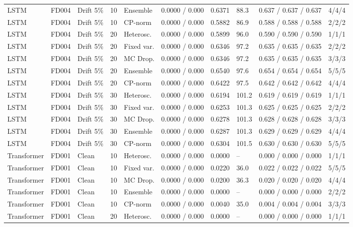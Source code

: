 \documentclass[10pt,a4paper]{article}
\begin{document}
\begin{landscape}
\begin{center}
\begin{longtable}{lllllcclll}
LSTM & FD004 & Drift 5\% & 10 & Ensemble & 0.0000 / 0.000 & 0.6371 & 88.3 & 0.637 / 0.637 / 0.637 & 4/4/4 \\
LSTM & FD004 & Drift 5\% & 10 & CP-norm & 0.0000 / 0.000 & 0.5882 & 86.9 & 0.588 / 0.588 / 0.588 & 2/2/2 \\
LSTM & FD004 & Drift 5\% & 20 & Heterosc. & 0.0000 / 0.000 & 0.5899 & 96.0 & 0.590 / 0.590 / 0.590 & 1/1/1 \\
LSTM & FD004 & Drift 5\% & 20 & Fixed var. & 0.0000 / 0.000 & 0.6346 & 97.2 & 0.635 / 0.635 / 0.635 & 2/2/2 \\
LSTM & FD004 & Drift 5\% & 20 & MC Drop. & 0.0000 / 0.000 & 0.6346 & 97.2 & 0.635 / 0.635 / 0.635 & 3/3/3 \\
LSTM & FD004 & Drift 5\% & 20 & Ensemble & 0.0000 / 0.000 & 0.6540 & 97.6 & 0.654 / 0.654 / 0.654 & 5/5/5 \\
LSTM & FD004 & Drift 5\% & 20 & CP-norm & 0.0000 / 0.000 & 0.6422 & 97.5 & 0.642 / 0.642 / 0.642 & 4/4/4 \\
LSTM & FD004 & Drift 5\% & 30 & Heterosc. & 0.0000 / 0.000 & 0.6194 & 101.2 & 0.619 / 0.619 / 0.619 & 1/1/1 \\
LSTM & FD004 & Drift 5\% & 30 & Fixed var. & 0.0000 / 0.000 & 0.6253 & 101.3 & 0.625 / 0.625 / 0.625 & 2/2/2 \\
LSTM & FD004 & Drift 5\% & 30 & MC Drop. & 0.0000 / 0.000 & 0.6278 & 101.3 & 0.628 / 0.628 / 0.628 & 3/3/3 \\
LSTM & FD004 & Drift 5\% & 30 & Ensemble & 0.0000 / 0.000 & 0.6287 & 101.3 & 0.629 / 0.629 / 0.629 & 4/4/4 \\
LSTM & FD004 & Drift 5\% & 30 & CP-norm & 0.0000 / 0.000 & 0.6304 & 101.5 & 0.630 / 0.630 / 0.630 & 5/5/5 \\
Transformer & FD001 & Clean & 10 & Heterosc. & 0.0000 / 0.000 & 0.0000 & -- & 0.000 / 0.000 / 0.000 & 1/1/1 \\
Transformer & FD001 & Clean & 10 & Fixed var. & 0.0000 / 0.000 & 0.0220 & 36.0 & 0.022 / 0.022 / 0.022 & 5/5/5 \\
Transformer & FD001 & Clean & 10 & MC Drop. & 0.0000 / 0.000 & 0.0200 & 36.3 & 0.020 / 0.020 / 0.020 & 4/4/4 \\
Transformer & FD001 & Clean & 10 & Ensemble & 0.0000 / 0.000 & 0.0000 & -- & 0.000 / 0.000 / 0.000 & 2/2/2 \\
Transformer & FD001 & Clean & 10 & CP-norm & 0.0000 / 0.000 & 0.0040 & 35.0 & 0.004 / 0.004 / 0.004 & 3/3/3 \\
Transformer & FD001 & Clean & 20 & Heterosc. & 0.0000 / 0.000 & 0.0000 & -- & 0.000 / 0.000 / 0.000 & 1/1/1 \\

\end{longtable}
\end{center}
\end{landscape}
\end{document}

